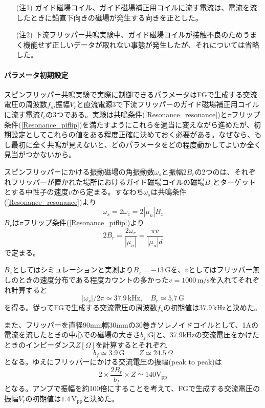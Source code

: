 \begin{itemize}
\item[(注$\!\!$1)] ガイド磁場コイル、ガイド磁場補正用コイルに流す電流は、電流を流したときに鉛直下向きの磁場が発生する向きを正とした。
\item[(注$\!\!$2)] 下流フリッパー共鳴実験中、ガイド磁場コイルが接触不良のためうまく機能せず正しいデータが取れない事態が発生したが、それについては省略した。
\end{itemize}

\paragraph{パラメータ初期設定}
スピンフリッパー共鳴実験で実際に制御できるパラメータはFGで生成する交流電圧の周波数$f_s$,振幅$V_r$と直流電源3で下流フリッパーのガイド磁場補正用コイルに流す電流$I_c$の3つである。実験は共鳴条件(\ref{Resonance_resonance})と$\pi$フリップ条件(\ref{Resonance_piflip})を満たすようにこれらを適当に変えながら進めたが、初期設定としてこれらの値をある程度正確に決めておく必要がある。なぜなら、もし最初に全く共鳴が見えないと、どのパラメータをどの程度動かしてよいか全く見当がつかないから。

スピンフリッパーにかける振動磁場の角振動数$\omega_s$と振幅$2B_r$の2つのは、それぞれフリッパーが置かれた場所におけるガイド磁場コイルの磁場$B_z$とターゲットとする中性子の速度$v$から定まる。すなわち$\omega_s$は共鳴条件(\ref{Resonance_resonance})より
\begin{equation}
\omega_s = 2\omega_z =2 |\mu_n|B_z
\end{equation}
$B_r$は$\pi$フリップ条件(\ref{Resonance_piflip})より
\begin{equation}
2B_r =\frac{2 \omega_r}{|\mu_n|} =\frac{\pi v}{|\mu_n|d}
\end{equation}
で定まる。

$B_z$としてはシミュレーションと実測より$B_z=-13 \, \mathrm{G}$を、$v$としてはフリッパー無しのときの速度分布である程度カウントの多かった$v=1000\, \mathrm{m/s}$を入れてそれぞれ計算すると
\begin{equation}
|\omega_s|/2\pi\simeq 37.9\, \mathrm{kHz}, \quad B_r\simeq 5.7 \, \mathrm{G}
\end{equation}
を得る。従ってFGで生成する交流電圧の周波数$f_s$の初期値は$37.9\,\mathrm{kHz}$と決めた。

また、フリッパーを直径90mm幅30mmの30巻きソレノイドコイルとして、1Aの電流を流したときの中心での磁場の大きさ$b_f$[G]と、37.9kHzの交流電圧をかけたときのインピーダンス$Z[\Omega]$を計算するとそれぞれ
\begin{equation}
b_f\simeq 3.9 \,\mathrm{G} \qquad Z \simeq 24.5 \,\Omega
\end{equation}
となる。ゆえにフリッパーにかける交流電圧の振幅(peak to peak)は
\[2 \times \frac{2B_r}{b_f} \times Z \simeq 140 \mathrm{V_{pp}}\]
となる。アンプで振幅を約100倍にすることを考えて、FGで生成する交流電圧の振幅$V_r$の初期値は$1.4 \,\mathrm{V_{pp}}$と決めた。

